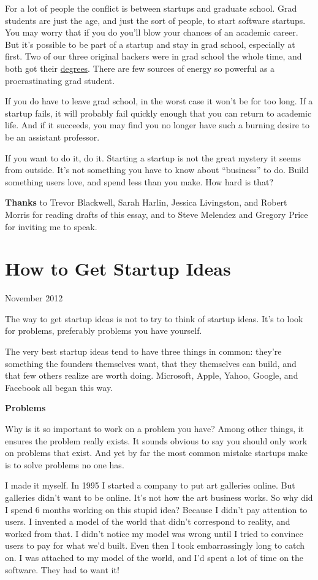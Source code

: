 \documentclass[12pt]{book}
\begin{document}
For a lot of people the conflict is between startups and graduate
school. Grad students are just the age, and just the sort of people, to
start software startups. You may worry that if you do you'll blow your
chances of an academic career. But it's possible to be part of a startup
and stay in grad school, especially at first. Two of our three original
hackers were in grad school the whole time, and both got their
\href{tlbphd.html}{degrees}. There are few sources of energy so powerful
as a procrastinating grad student.

If you do have to leave grad school, in the worst case it won't be for
too long. If a startup fails, it will probably fail quickly enough that
you can return to academic life. And if it succeeds, you may find you no
longer have such a burning desire to be an assistant professor.

If you want to do it, do it. Starting a startup is not the great mystery
it seems from outside. It's not something you have to know about
``business'' to do. Build something users love, and spend less than you
make. How hard is that?


\textbf{Thanks} to Trevor Blackwell, Sarah Harlin, Jessica Livingston,
and Robert Morris for reading drafts of this essay, and to Steve
Melendez and Gregory Price for inviting me to speak.
\chapter{How to Get Startup Ideas}

November 2012

The way to get startup ideas is not to try to think of startup ideas.
It's to look for problems, preferably problems you have yourself.

The very best startup ideas tend to have three things in common: they're
something the founders themselves want, that they themselves can build,
and that few others realize are worth doing. Microsoft, Apple, Yahoo,
Google, and Facebook all began this way.

\textbf{Problems}

Why is it so important to work on a problem you have? Among other
things, it ensures the problem really exists. It sounds obvious to say
you should only work on problems that exist. And yet by far the most
common mistake startups make is to solve problems no one has.

I made it myself. In 1995 I started a company to put art galleries
online. But galleries didn't want to be online. It's not how the art
business works. So why did I spend 6 months working on this stupid idea?
Because I didn't pay attention to users. I invented a model of the world
that didn't correspond to reality, and worked from that. I didn't notice
my model was wrong until I tried to convince users to pay for what we'd
built. Even then I took embarrassingly long to catch on. I was attached
to my model of the world, and I'd spent a lot of time on the software.
They had to want it!
\end{document}
